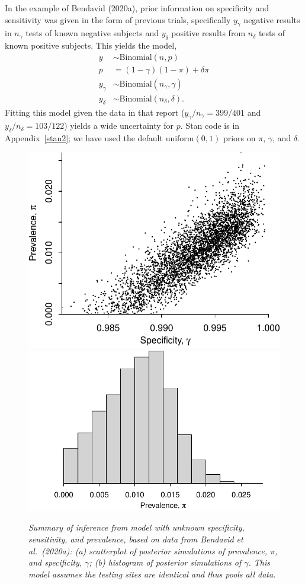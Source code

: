 \documentclass[11pt]{article}
\begin{document}
In the example of Bendavid (2020a), prior information on specificity and sensitivity was given in the form of previous trials, specifically $y_{\gamma}$ negative results in $n_{\gamma}$ tests of known negative subjects and $y_{\delta}$ positive results from $n_{\delta}$ tests of known positive subjects.  This yields the model,
  \begin{align*}
   y & \sim \mbox{Binomial} (n, p)\\
  p & = (1-\gamma)(1- \pi)+ \delta\pi\\
   y_{\gamma} & \sim \mbox{Binomial} (n_{\gamma}, \gamma)\\
   y_{\delta} & \sim \mbox{Binomial} (n_{\delta}, \delta).
 \end{align*}
 Fitting this model given the data in that report ($y_{\gamma}/n_{\gamma}=399/401$ and $y_{\delta}/n_{\delta}=103/122$) yields a wide uncertainty for $p$.  Stan code is in Appendix~\ref{stan2}; we have used the default $\mbox{uniform}(0,1)$ priors on $\pi$, $\gamma$, and $\delta$.

\begin{figure}
\centerline{ \includegraphics[width=.45\textwidth]{scatter.pdf} \includegraphics[width=.55\textwidth]{hist.pdf}}
\caption{\em Summary of inference from model with unknown specificity, sensitivity, and prevalence, based on data from Bendavid et al.\ (2020a):  (a) scatterplot of posterior simulations of prevalence, $\pi$, and specificity, $\gamma$; (b) histogram of posterior simulations of $\gamma$.  This model assumes the testing sites are identical and thus pools all data.}
\label{posterior1}
\end{figure}
\end{document}
